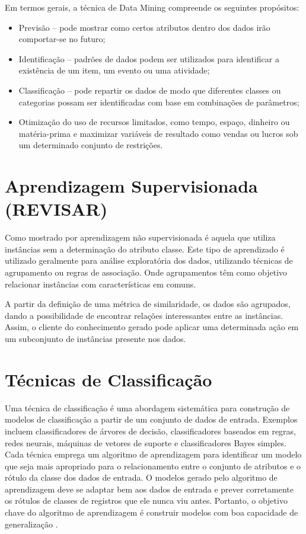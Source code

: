 \documentclass[
	12pt,				%
	openright,			%
	oneside,	
	a4paper,				%
	english,				%
	brazil				%
]{abntex2/abntex2} %
\begin{document}
		Em termos gerais, a técnica de Data Mining compreende os seguintes propósitos:
		
		\begin{itemize}
			\item Previsão – pode mostrar como certos atributos dentro dos dados irão comportar-se no futuro;
			\item Identificação – padrões de dados podem ser utilizados para identificar a existência de um item, um evento ou uma atividade;
			\item Classificação – pode repartir os dados de modo que diferentes classes ou categorias possam ser identificadas com base em combinações de parâmetros;
			\item Otimização do uso de recursos limitados, como tempo, espaço, dinheiro ou matéria-prima e maximizar variáveis de resultado como vendas ou lucros sob um determinado conjunto de restrições.
		\end{itemize}
		
	\section{Aprendizagem Supervisionada (REVISAR)}
	
		Como mostrado por \cite{damasceno:2005} aprendizagem não supervisionada é aquela que utiliza instâncias sem a determinação do atributo classe. Este  tipo de aprendizado é utilizado geralmente para análise exploratória dos dados, utilizando técnicas de  agrupamento ou regras de associação. Onde agrupamentos têm como objetivo relacionar instâncias com características em comuns.
		
		A partir da definição de uma métrica de similaridade, os dados são  agrupados, dando a possibilidade de encontrar relações interessantes entre as instâncias. Assim, o cliente do conhecimento gerado pode aplicar uma determinada ação em um subconjunto de instâncias presente nos  dados. 
		
	\section{Técnicas de Classificação}
	
	Uma técnica de classificação é uma abordagem sistemática para construção de modelos de classificação a partir de um conjunto de dados de entrada. Exemplos incluem classificadores de árvores de decisão, classificadores baseados em regras, redes neurais, máquinas de vetores de suporte e classificadores Bayes simples. Cada técnica emprega um algoritmo de aprendizagem para identificar um modelo que seja mais apropriado para o relacionamento entre o conjunto de atributos e o rótulo da classe dos dados de entrada. O modelos gerado pelo algoritmo de aprendizagem deve se adaptar bem aos dados de entrada e prever corretamente os rótulos de classes de registros que ele nunca viu antes. Portanto, o objetivo chave do algoritmo de aprendizagem é construir modelos com boa capacidade de generalização \cite{tan:2009}.
	
\end{document}
